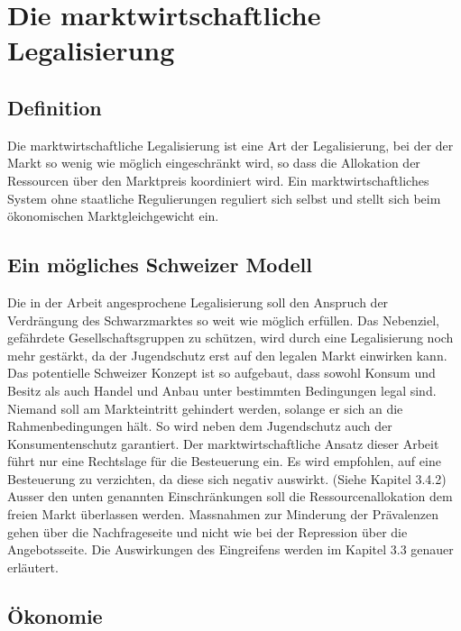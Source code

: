 \documentclass[../main.tex]{subfiles}
\begin{document}
	 \section{Die marktwirtschaftliche Legalisierung}
	 
	 \subsection{Definition}
	 Die marktwirtschaftliche Legalisierung ist eine Art der Legalisierung, bei der der Markt so wenig wie möglich eingeschränkt wird, so dass die Allokation der Ressourcen über den Marktpreis koordiniert wird.
	 Ein marktwirtschaftliches System ohne staatliche Regulierungen reguliert sich selbst und stellt sich beim ökonomischen Marktgleichgewicht ein.
	 
	 
	 
	 \subsection{Ein mögliches Schweizer Modell}
	 Die in der Arbeit angesprochene Legalisierung soll den Anspruch der Verdrängung des Schwarzmarktes so weit wie möglich erfüllen.
	 Das Nebenziel, gefährdete Gesellschaftsgruppen zu schützen, wird durch eine Legalisierung noch mehr gestärkt, da der Jugendschutz erst auf den legalen Markt einwirken kann.
	 Das potentielle Schweizer Konzept ist so aufgebaut, dass sowohl Konsum und Besitz als auch Handel und Anbau unter bestimmten Bedingungen legal sind.
	 Niemand soll am Markteintritt gehindert werden, solange er sich an die Rahmenbedingungen hält.
	 So wird neben dem Jugendschutz auch der Konsumentenschutz garantiert.
	 Der marktwirtschaftliche Ansatz dieser Arbeit führt nur eine Rechtslage für die Besteuerung ein.
	 Es wird empfohlen, auf eine Besteuerung zu verzichten, da diese sich negativ auswirkt. 
	 (Siehe Kapitel 3.4.2)\\
	 
	 \noindent
	 Ausser den unten genannten Einschränkungen soll die Ressourcenallokation dem freien Markt überlassen werden. 	 
	 Massnahmen zur Minderung der Prävalenzen gehen über die Nachfrageseite und nicht wie bei der Repression über die Angebotsseite.
	 Die Auswirkungen des Eingreifens werden im Kapitel 3.3 genauer erläutert.
	 
	 
	 \subsection{Ökonomie}
	 
\end{document}
